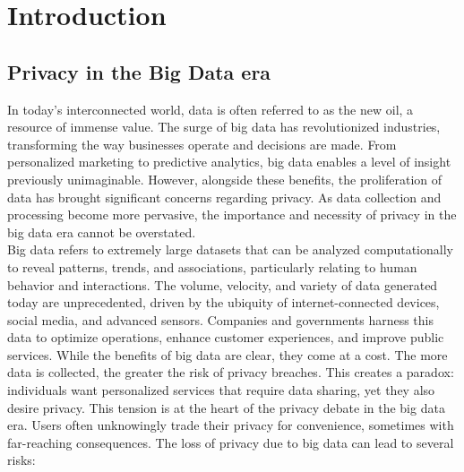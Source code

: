 \chapter{Introduction}
\label{ch:Introduction}

\section{Privacy in the Big Data era}

In today's interconnected world, data is often referred to as the new oil, a resource of immense value. The surge of big data has revolutionized industries, transforming the way businesses operate and decisions are made. From personalized marketing to predictive analytics, big data enables a level of insight previously unimaginable. However, alongside these benefits, the proliferation of data has brought significant concerns regarding privacy. As data collection and processing become more pervasive, the importance and necessity of privacy in the big data era cannot be overstated.\\
Big data refers to extremely large datasets that can be analyzed computationally to reveal patterns, trends, and associations, particularly relating to human behavior and interactions. The volume, velocity, and variety of data generated today are unprecedented, driven by the ubiquity of internet-connected devices, social media, and advanced sensors. Companies and governments harness this data to optimize operations, enhance customer experiences, and improve public services. While the benefits of big data are clear, they come at a cost. The more data is collected, the greater the risk of privacy breaches. This creates a paradox: individuals want personalized services that require data sharing, yet they also desire privacy. This tension is at the heart of the privacy debate in the big data era. Users often unknowingly trade their privacy for convenience, sometimes with far-reaching consequences.
The loss of privacy due to big data can lead to several risks:

